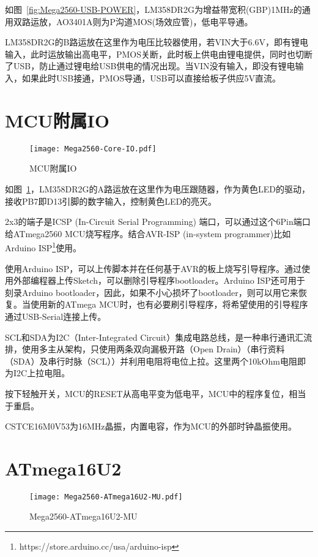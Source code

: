 如图~\ref{fig:Mega2560-USB-POWER}，LM358DR2G为增益带宽积(GBP)1MHz的通用双路运放，AO3401A则为P沟道MOS(场效应管)，低电平导通。

LM358DR2G的B路运放在这里作为电压比较器使用，若VIN大于6.6V，即有锂电输入，此时运放输出高电平，PMOS关断，此时板上供电由锂电提供，同时也切断了USB，防止通过锂电给USB供电的情况出现。当VIN没有输入，即没有锂电输入，如果此时USB接通，PMOS导通，USB可以直接给板子供应5V直流。

\section{MCU附属IO}

\begin{figure}[htbp]
    \centering
    \texttt{[image: Mega2560-Core-IO.pdf]}
    \caption{MCU附属IO}
    \label{fig:Mega2560-Core-IO}
\end{figure}

如图~\ref{fig:Mega2560-Core-IO}，LM358DR2G的A路运放在这里作为电压跟随器，作为黄色LED的驱动，接收PB7即D13引脚的数字输入，控制黄色LED的亮灭。

2x3的端子是ICSP (In-Circuit Serial Programming) 端口，可以通过这个6Pin端口给ATmega2560 MCU烧写程序。结合AVR-ISP (in-system programmer)比如Arduino ISP\footnote{https://store.arduino.cc/usa/arduino-isp}使用。

使用Arduino ISP，可以上传脚本并在任何基于AVR的板上烧写引导程序。通过使用外部编程器上传Sketch，可以删除引导程序bootloader。Arduino ISP还可用于刻录Arduino bootloader，因此，如果不小心损坏了bootloader，则可以用它来恢复。当使用新的ATmega MCU时，也有必要刷引导程序，将希望使用的引导程序通过USB-Serial连接上传。

SCL和SDA为I2C（Inter-Integrated Circuit）集成电路总线，是一种串行通讯汇流排，使用多主从架构，只使用两条双向漏极开路（Open Drain）（串行资料（SDA）及串行时脉（SCL））并利用电阻将电位上拉。这里两个10kOhm电阻即为I2C上拉电阻。

按下轻触开关，MCU的RESET从高电平变为低电平，MCU中的程序复位，相当于重启。

CSTCE16M0V53为16MHz晶振，内置电容，作为MCU的外部时钟晶振使用。

\section{ATmega16U2}

\begin{figure}[htbp]
    \centering
    \texttt{[image: Mega2560-ATmega16U2-MU.pdf]}
    \caption{Mega2560-ATmega16U2-MU}
    \label{fig:Mega2560-ATmega16U2-MU}
\end{figure}


